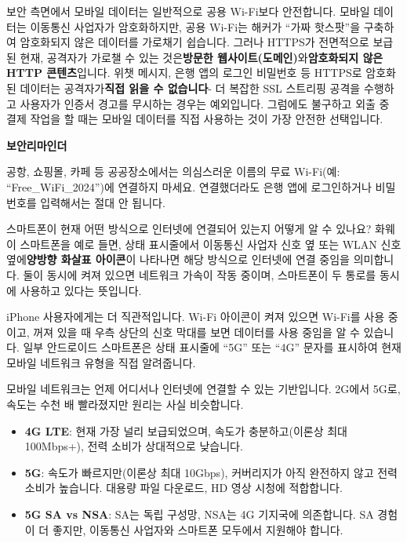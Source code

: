 
보안 측면에서 모바일 데이터는 일반적으로 공용 Wi-Fi보다 안전합니다. 모바일 데이터는 이동통신 사업자가 암호화하지만, 공용 Wi-Fi는 해커가 “가짜 핫스팟”을 구축하여 암호화되지 않은 데이터를 가로채기 쉽습니다. 그러나 HTTPS가 전면적으로 보급된 현재, 공격자가 가로챌 수 있는 것은\textbf{방문한 웹사이트(도메인)}와\textbf{암호화되지 않은 HTTP 콘텐츠}입니다. 위챗 메시지, 은행 앱의 로그인 비밀번호 등 HTTPS로 암호화된 데이터는 공격자가\textbf{직접 읽을 수 없습니다}- 더 복잡한 SSL 스트리핑 공격을 수행하고 사용자가 인증서 경고를 무시하는 경우는 예외입니다. 그럼에도 불구하고 외출 중 결제 작업을 할 때는 모바일 데이터를 직접 사용하는 것이 가장 안전한 선택입니다.

\textbf{보안리마인더}\par

공항, 쇼핑몰, 카페 등 공공장소에서는 의심스러운 이름의 무료 Wi-Fi(예: “Free\_WiFi\_2024”)에 연결하지 마세요. 연결했더라도 은행 앱에 로그인하거나 비밀번호를 입력해서는 절대 안 됩니다.


스마트폰이 현재 어떤 방식으로 인터넷에 연결되어 있는지 어떻게 알 수 있나요? 화웨이 스마트폰을 예로 들면, 상태 표시줄에서 이동통신 사업자 신호 옆 또는 WLAN 신호 옆에\textbf{양방향 화살표 아이콘}이 나타나면 해당 방식으로 인터넷에 연결 중임을 의미합니다. 둘이 동시에 켜져 있으면 네트워크 가속이 작동 중이며, 스마트폰이 두 통로를 동시에 사용하고 있다는 뜻입니다.

iPhone 사용자에게는 더 직관적입니다. Wi-Fi 아이콘이 켜져 있으면 Wi-Fi를 사용 중이고, 꺼져 있을 때 우측 상단의 신호 막대를 보면 데이터를 사용 중임을 알 수 있습니다. 일부 안드로이드 스마트폰은 상태 표시줄에 “5G” 또는 “4G” 문자를 표시하여 현재 모바일 네트워크 유형을 직접 알려줍니다.


모바일 네트워크는 언제 어디서나 인터넷에 연결할 수 있는 기반입니다. 2G에서 5G로, 속도는 수천 배 빨라졌지만 원리는 사실 비슷합니다.


\begin{itemize}
  \item \textbf{4G LTE}: 현재 가장 널리 보급되었으며, 속도가 충분하고(이론상 최대 100Mbps+), 전력 소비가 상대적으로 낮습니다.
  \item \textbf{5G}: 속도가 빠르지만(이론상 최대 10Gbps), 커버리지가 아직 완전하지 않고 전력 소비가 높습니다. 대용량 파일 다운로드, HD 영상 시청에 적합합니다.
  \item \textbf{5G SA vs NSA}: SA는 독립 구성망, NSA는 4G 기지국에 의존합니다. SA 경험이 더 좋지만, 이동통신 사업자와 스마트폰 모두에서 지원해야 합니다.
\end{itemize}

